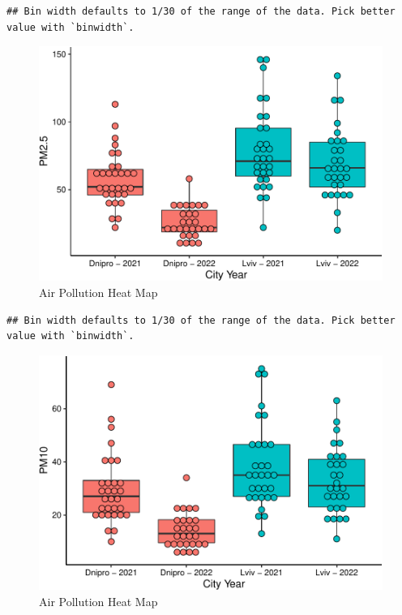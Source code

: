 \documentclass[
  12pt,
]{article}
\begin{document}
\begin{verbatim}
## Bin width defaults to 1/30 of the range of the data. Pick better value with `binwidth`.
\end{verbatim}

\begin{figure}
\centering
\includegraphics{Fontanie_Gordon_Weinberg_Project_files/figure-latex/heat map of air pollution-2.pdf}
\caption{Air Pollution Heat Map}
\end{figure}

\begin{verbatim}
## Bin width defaults to 1/30 of the range of the data. Pick better value with `binwidth`.
\end{verbatim}

\begin{figure}
\centering
\includegraphics{Fontanie_Gordon_Weinberg_Project_files/figure-latex/heat map of air pollution-3.pdf}
\caption{Air Pollution Heat Map}
\end{figure}
\end{document}
